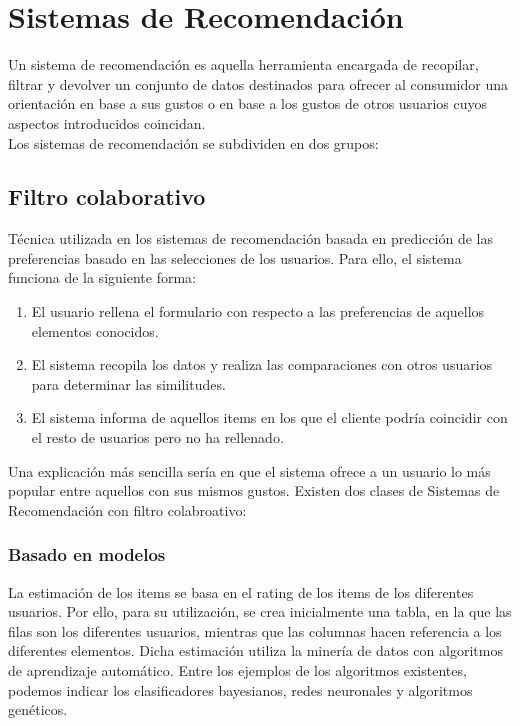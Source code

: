 \section{Sistemas de Recomendación}
Un sistema de recomendación es aquella herramienta encargada de recopilar, filtrar y devolver un conjunto de datos destinados para ofrecer al consumidor una orientación en base a sus gustos o en base a los gustos de otros usuarios cuyos aspectos introducidos coincidan.\nocite{wiki:recomendacion} \\
Los sistemas de recomendación se subdividen en dos grupos: 
\subsection{Filtro colaborativo}
Técnica utilizada en los sistemas de recomendación basada en predicción de las preferencias basado en las selecciones de los usuarios. Para ello, el sistema funciona de la siguiente forma: \nocite{andres_gonzalez_sistemas_2014}
\begin{enumerate}
\item El usuario rellena el formulario con respecto a las preferencias de aquellos elementos conocidos.
\item El sistema recopila los datos y realiza las comparaciones con otros usuarios para determinar las similitudes. \nocite{upf:recomendacion}
\item El sistema informa de aquellos items en los que el cliente podría coincidir con el resto de usuarios pero no ha rellenado. \cite{wiki:filtrado}
\end{enumerate}
Una explicación más sencilla sería en que el sistema ofrece a un usuario lo más popular entre aquellos con sus mismos gustos.\nocite{ucm:recomendacion} 
Existen dos clases de Sistemas de Recomendación con filtro colabroativo: 
\subsubsection{Basado en modelos}
La estimación de los items se basa en el rating de los items de los diferentes usuarios. 
Por ello, para su utilización, se crea inicialmente una tabla, en la que las filas son los diferentes usuarios, mientras que las columnas hacen referencia a los diferentes elementos.
Dicha estimación utiliza la minería de datos con algoritmos de aprendizaje automático. Entre los ejemplos de los algoritmos existentes, podemos indicar los clasificadores bayesianos, redes neuronales y algoritmos genéticos.\nocite{wiki:filtrado} 



